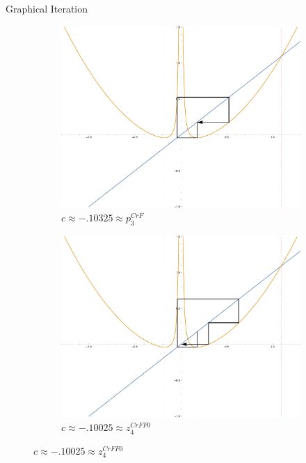 \documentclass{beamer}
\newcommand{\<}{\left\langle}
\renewcommand{\>}{\right\rangle} %
\renewcommand{\*}{\cdot} %
\begin{document}
\begin{frame}[allowframebreaks]{Graphical Iteration}
\begin{figure}[ht]
		\begin{subfigure}[b]{.49\textwidth}
				\includegraphics[width=\textwidth]{./img/plot-010325}
				\caption{$c \approx - .10325 \approx p_3^{CrF}$}
		\end{subfigure}
		\begin{subfigure}[b]{.49\textwidth}
				\includegraphics[width=\textwidth]{./img/plot-010025}
				\caption{$c \approx -.10025 \approx z_4^{CrFF0}$}
		\end{subfigure}
		

\end{figure}
\end{frame}
\end{document}
